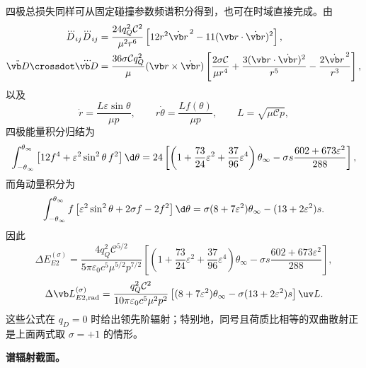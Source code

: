 四极总损失同样可从固定碰撞参数频谱积分得到，也可在时域直接完成。由
\begin{equation*}
	\begin{aligned}
	\dddot D_{ij}\dddot D_{ij}
	&=\frac{24q_Q^2\mathcal C^2}{\mu^2r^6}
	\left[12r^2\dot{\vb r}^{\,2}
	-11(\vb r\cdot\dot{\vb r})^2\right],\\
	\ddot{\vb D}\crossdot\dddot{\vb D}
	&=\frac{36\sigma\mathcal C q_Q^2}{\mu}
	(\vb r\times\dot{\vb r})
	\left[
	\frac{2\sigma\mathcal C}{\mu r^4}
	+\frac{3(\vb r\cdot\dot{\vb r})^2}{r^5}
	-\frac{2\dot{\vb r}^{\,2}}{r^3}
	\right],
	\end{aligned}
\end{equation*}
以及
\begin{equation*}
	\dot r=\frac{L\varepsilon\sin\theta}{\mu p},
	\qquad
	r\dot\theta=\frac{Lf(\theta)}{\mu p},
	\qquad
	L=\sqrt{\mu\mathcal C p},
\end{equation*}
四极能量积分归结为
\begin{equation*}
	\int_{-\theta_\infty}^{\theta_\infty}
	\left[12f^4+\varepsilon^2\sin^2\theta\,f^2\right]\d\theta
	=24\left[
	\left(1+\frac{73}{24}\varepsilon^2+\frac{37}{96}\varepsilon^4\right)\theta_\infty
	-\sigma s\frac{602+673\varepsilon^2}{288}
	\right],
\end{equation*}
而角动量积分为
\begin{equation*}
	\int_{-\theta_\infty}^{\theta_\infty}
	f\left[\varepsilon^2\sin^2\theta+2\sigma f-2f^2\right]\d\theta
	=\sigma(8+7\varepsilon^2)\theta_\infty
	-(13+2\varepsilon^2)s.
\end{equation*}
因此
\begin{equation*}
	\Delta E_{E2}^{(\sigma)}
	=\frac{4q_Q^2\mathcal C^{5/2}}
	{5\pi\varepsilon_0c^5\mu^{5/2}p^{7/2}}
	\left[
	\left(1+\frac{73}{24}\varepsilon^2+\frac{37}{96}\varepsilon^4\right)\theta_\infty
	-\sigma s\frac{602+673\varepsilon^2}{288}
	\right],
\end{equation*}
\begin{equation*}
	\Delta\vb L_{E2,\mathrm{rad}}^{(\sigma)}
	=\frac{q_Q^2\mathcal C^2}
	{10\pi\varepsilon_0c^5\mu^2p^2}
	\left[
	(8+7\varepsilon^2)\theta_\infty
	-\sigma(13+2\varepsilon^2)s
	\right]\uv L.
\end{equation*}
这些公式在 $q_D=0$ 时给出领先阶辐射；特别地，同号且荷质比相等的双曲散射正是上面两式取 $\sigma=+1$ 的情形。

\textbf{谱辐射截面。}

